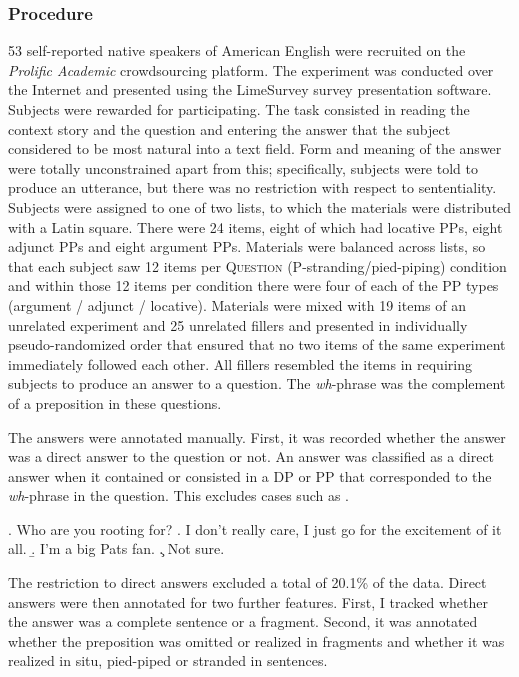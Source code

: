 \subsubsection{Procedure} 
53 self-reported native speakers of American English were recruited on the \textit{Prolific Academic} crowdsourcing platform. The experiment was conducted over the Internet and presented using the LimeSurvey survey presentation software. Subjects were rewarded  for participating. The task consisted in reading the context story and the question and entering the answer that the subject considered to be most natural into a text field. Form and meaning of the answer were totally unconstrained apart from this; specifically, subjects were told to produce an utterance, but there was no restriction with respect to sententiality. Subjects were assigned to one of two lists, to which the materials were distributed with a Latin square. There were 24 items, eight of which had locative PPs, eight adjunct PPs and eight argument PPs. Materials were balanced across lists, so that each subject saw 12 items per \textsc{Question} (P-stranding/pied-piping) condition and within those 12 items per condition there were four of each of the PP types (argument / adjunct / locative). Materials were mixed with 19 items of an unrelated experiment and 25 unrelated fillers and presented in individually pseudo-randomized order that ensured that no two items of the same experiment immediately followed each other. All fillers resembled the items in requiring subjects to produce an answer to a question. The \textit{wh}-phrase was the complement of a preposition in these questions.

The answers were annotated manually. First, it was recorded whether the answer was a direct answer to the question or not. An answer was classified as a direct answer when it contained or consisted in a DP or PP that corresponded to the \textit{wh}-phrase in the question. This excludes cases such as \Next.

\ex. Who are you rooting for?
\a. I don't really care, I just go for the excitement of it all. 
     \b. I'm a big Pats fan.
     \c. Not sure.
     
The restriction to direct answers excluded a total of 20.1\% of the data. Direct answers were then annotated for two further features. First, I tracked whether the answer was a complete sentence or a fragment. Second, it was annotated whether the preposition was omitted or realized in fragments and whether it was realized in situ, pied-piped or stranded in sentences.

